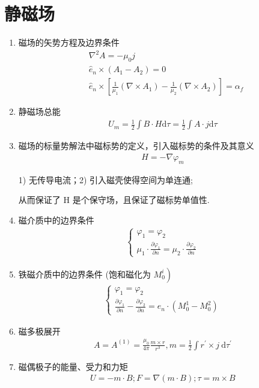\documentclass[../../note.tex]{subfiles}
\begin{document}
	\section{静磁场}
\begin{enumerate}
	\item 磁场的矢势方程及边界条件
	\begin{align}
		& \nabla^2 A=-\mu_0 j \\
		& \hat{e}_n \times\left(A_1-A_2\right)=0 \\
		& \hat{e}_n \times\left[\frac{1}{\mu_1}\left(\nabla \times A_1\right)-\frac{1}{\mu_2}\left(\nabla \times A_2\right)\right]=\alpha_f
	\end{align}
	\item 静磁场总能
\begin{align}
	U_m=\frac{1}{2} \int {B} \cdot {H} \mathrm{d} \tau=\frac{1}{2} \int {A} \cdot {j} \mathrm{d} \tau
\end{align}
	\item 磁场的标量势解法中磁标势的定义，引入磁标势的条件及其意义
\begin{align}
	{H}=-\nabla \varphi_m
\end{align}
	
	1) 无传导电流；2) 引入磁壳使得空间为单连通;
	
	从而保证了 $\mathrm{H}$ 是个保守场，且保证了磁标势单值性.
	
	\item 磁介质中的边界条件
	\begin{align}
	\left\{\begin{array}{l}
		\varphi_1=\varphi_2 \\
		\mu_1 \cdot \frac{\partial \varphi_1}{\partial n}=\mu_2 \cdot \frac{\partial \varphi_2}{\partial n}
	\end{array}\right.
	\end{align}
	\item 铁磁介质中的边界条件 (饱和磁化为 $\left.M_0^i\right)$
	\begin{align}
	\left\{\begin{array}{l}
		\varphi_1=\varphi_2 \\
		\frac{\partial \varphi_1}{\partial n}-\frac{\partial \varphi_2}{\partial n}=e_n \cdot\left(M_0^1-M_0^2\right)
	\end{array}\right.
	\end{align}
	\item 磁多极展开
	\begin{align}
	A=A^{(1)}=\frac{\mu_0}{4 \pi} \frac{m \times r}{r^3}, m=\frac{1}{2} \int r^{\prime} \times j \mathrm{~d} \tau^{\prime}
	\end{align}
	\item 磁偶极子的能量、受力和力矩
	\begin{align}
	U=-m \cdot B ; F=\nabla(m \cdot B) ; \tau=m \times B
		\end{align}
\end{enumerate}
\end{document}
